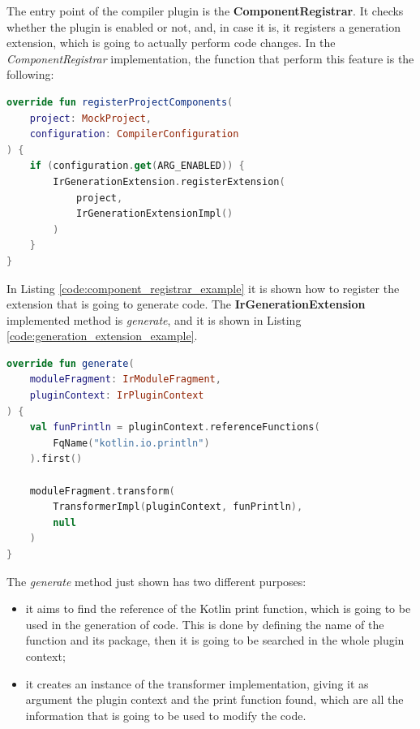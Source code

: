 The entry point of the compiler plugin is the \textbf{ComponentRegistrar}. It checks whether the plugin is enabled or not, and, in case it is, it registers a generation extension, which is going to actually perform code changes. In the \textit{ComponentRegistrar} implementation, the function that perform this feature is the following:
\begin{lstlisting}[caption={Example of registration of extension if the plugin is enabled performed by the \textit{ComponentRegistrar}}, captionpos=b, language=Kotlin, label={code:component_registrar_example}]
override fun registerProjectComponents(
    project: MockProject,
    configuration: CompilerConfiguration
) {
    if (configuration.get(ARG_ENABLED)) {
        IrGenerationExtension.registerExtension(
            project,
            IrGenerationExtensionImpl()
        )
    }
}
\end{lstlisting}
In Listing \ref{code:component_registrar_example} it is shown how to register the extension that is going to generate code. The \textbf{IrGenerationExtension} implemented method is \textit{generate}, and it is shown in Listing \ref{code:generation_extension_example}.
\begin{lstlisting}[caption={Example of \textit{IrGenerationExtension} implementation of methos generate}, captionpos=b, language=Kotlin, label={code:generation_extension_example}]
override fun generate(
    moduleFragment: IrModuleFragment,
    pluginContext: IrPluginContext
) {
    val funPrintln = pluginContext.referenceFunctions(
        FqName("kotlin.io.println")
    ).first()

    moduleFragment.transform(
        TransformerImpl(pluginContext, funPrintln),
        null
    )
}
\end{lstlisting}
The \textit{generate} method just shown has two different purposes:
\begin{itemize}
    \item it aims to find the reference of the Kotlin print function, which is going to be used in the generation of code. This is done by defining the name of the function and its package, then it is going to be searched in the whole plugin context;
    \item it creates an instance of the transformer implementation, giving it as argument the plugin context and the print function found, which are all the information that is going to be used to modify the code.
\end{itemize}

